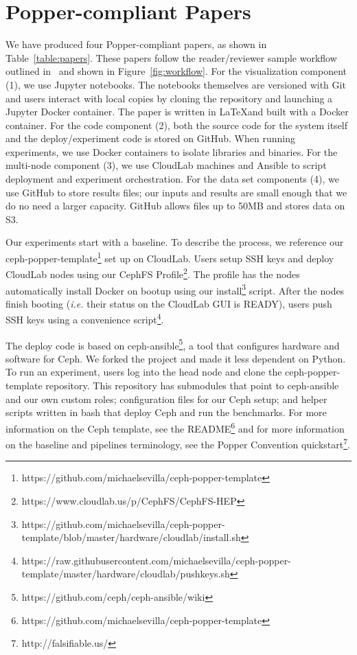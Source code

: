 \section{Popper-compliant Papers}
\label{sec:popper-compliant-papers}

We have produced four Popper-compliant papers, as shown in
Table~\ref{table:papers}. These papers follow the reader/reviewer sample
workflow outlined in~\cite{jimenez:ipdpsw17-popper} and shown in
Figure~\ref{fig:workflow}. For the visualization component (1), we use Jupyter
notebooks. The notebooks themselves are versioned with Git and users interact
with local copies by cloning the repository and launching a Jupyter Docker
container. The paper is written in \LaTeX and built with a Docker container.
For the code component (2), both the source code for the system itself and the
deploy/experiment code is stored on GitHub. When running experiments, we use
Docker containers to isolate libraries and binaries. For the multi-node
component (3), we use CloudLab machines and Ansible to script deployment and
experiment orchestration. For the data set components (4), we use GitHub to
store results files; our inputs and results are small enough that we do no need
a larger capacity.  GitHub allows files up to 50MB and stores data on S3.

Our experiments start with a baseline. To describe the process, we reference
our
ceph-popper-template\footnote{https://github.com/michaelsevilla/ceph-popper-template}
set up on CloudLab. Users setup SSH keys and deploy CloudLab nodes using our
CephFS Profile\footnote{https://www.cloudlab.us/p/CephFS/CephFS-HEP}.  The
profile has the nodes automatically install Docker on bootup using our
install\footnote{https://github.com/michaelsevilla/ceph-popper-template/blob/master/hardware/cloudlab/\-install.sh}
script. After the nodes finish booting ({\it i.e.}  their status on the
CloudLab GUI is READY), users push SSH keys using a convenience
script\footnote{https://raw.githubusercontent.com/michaelsevilla/ceph-popper-template/master/hardware/cloudlab/pushkeys.sh}.

The deploy code is based on
ceph-ansible\footnote{https://github.com/ceph/ceph-ansible/wiki}, a tool that
configures hardware and software for Ceph. We forked the project and made it
less dependent on Python. To run an experiment, users log into the head node
and clone the ceph-popper-template repository. This repository has submodules
that point to ceph-ansible and our own custom roles; configuration files for
our Ceph setup; and helper scripts written in bash that deploy Ceph and run the
benchmarks.  For more information on the Ceph template, see the
README\footnote{https://github.com/michaelsevilla/ceph-popper-template} and for
more information on the baseline and pipelines terminology, see the Popper
Convention quickstart\footnote{http://falsifiable.us/}. 

